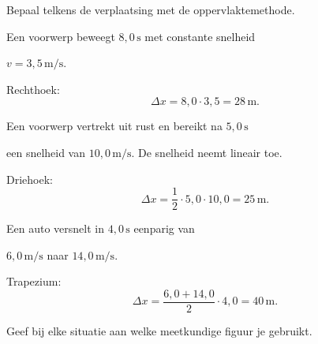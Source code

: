 \documentclass{ximera}
\begin{document}
\begin{oefening}{\oefB\ESS}

Bepaal telkens de verplaatsing met de oppervlaktemethode.

\begin{question}

Een voorwerp beweegt $8,0\,\mathrm{s}$ met constante snelheid

$v=3,5\,\mathrm{m/s}$.

\begin{oplossing}
Rechthoek:
\[\Delta x=8,0\cdot3,5=28\,\mathrm{m}.\]
\end{oplossing}

\end{question}

\begin{question}

Een voorwerp vertrekt uit rust en bereikt na $5,0\,\mathrm{s}$

een snelheid van $10,0\,\mathrm{m/s}$. De snelheid neemt lineair toe.

\begin{oplossing}
Driehoek:
\[\Delta x=\frac12\cdot5,0\cdot10,0=25\,\mathrm{m}.\]
\end{oplossing}

\end{question}

\begin{question}

Een auto versnelt in $4,0\,\mathrm{s}$ eenparig van

$6,0\,\mathrm{m/s}$ naar $14,0\,\mathrm{m/s}$.

\begin{oplossing}
Trapezium:
\[\Delta x=\frac{6,0+14,0}{2}\cdot4,0=40\,\mathrm{m}.\]
\end{oplossing}

\end{question}

Geef bij elke situatie aan welke meetkundige figuur je gebruikt.

\end{oefening}
\end{document}
